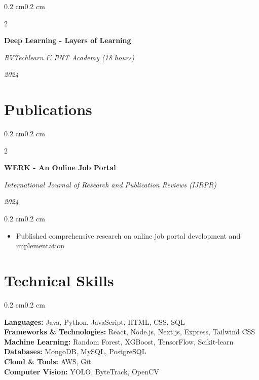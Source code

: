\documentclass[10pt, letterpaper]{article}
\newenvironment{highlights}{
    \begin{itemize}[
        topsep=0.10 cm,
        parsep=0.10 cm,
        partopsep=0pt,
        itemsep=0pt,
        leftmargin=0.4 cm + 10pt
    ]
}{\end{itemize}}
\newenvironment{onecolentry}{
    \begin{adjustwidth}{0.2 cm}{0.2 cm}
}{\end{adjustwidth}}
\newenvironment{twocolentry}[2][]{
    \onecolentry
    \def\secondColumn{#2}
    \setcolumnwidth{\fill, 4.5 cm}
    \begin{paracol}{2}
}{
    \switchcolumn \raggedleft \secondColumn
    \end{paracol}
    \endonecolentry
}
\begin{document}
    \vspace{0.2 cm}

    \begin{twocolentry}{
        \textit{2024}
    }
        \textbf{Deep Learning - Layers of Learning}
        
        \textit{RVTechlearn \& PNT Academy (18 hours)}
    \end{twocolentry}

    \section{Publications}
    
    \begin{twocolentry}{
        \textit{2024}
    }
        \textbf{WERK - An Online Job Portal}
        
        \textit{International Journal of Research and Publication Reviews (IJRPR)}
    \end{twocolentry}
    
    \vspace{0.10 cm}
    \begin{onecolentry}
        \begin{highlights}
            \item Published comprehensive research on online job portal development and implementation
        \end{highlights}
    \end{onecolentry}

    \section{Technical Skills}
    \begin{onecolentry}
        \textbf{Languages:} Java, Python, JavaScript, HTML, CSS, SQL \\
        \textbf{Frameworks \& Technologies:} React, Node.js, Next.js, Express, Tailwind CSS \\
        \textbf{Machine Learning:} Random Forest, XGBoost, TensorFlow, Scikit-learn \\
        \textbf{Databases:} MongoDB, MySQL, PostgreSQL \\
        \textbf{Cloud \& Tools:} AWS, Git \\
        \textbf{Computer Vision:} YOLO, ByteTrack, OpenCV
    \end{onecolentry}
\end{document}
